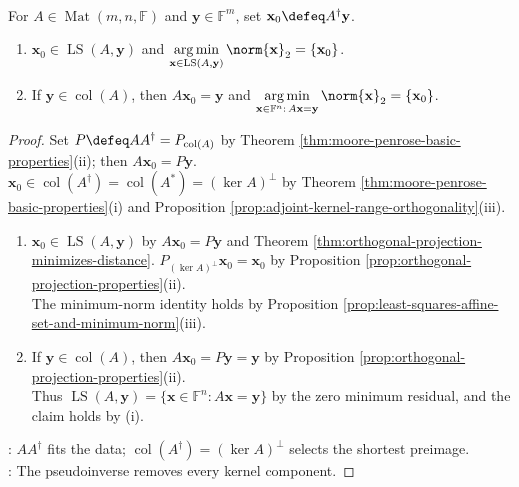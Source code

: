 \begin{theorem} \label{thm:pseudoinverse-minimum-norm-least-squares} \\
For $A\in\operatorname{Mat}(m,n,\mathbb{F})$ and $\mathbf{y}\in\mathbb{F}^m$, set $\mathbf{x}_0\defeq A^{\dagger}\mathbf{y}$.
\begin{enumerate}[label=(\roman*)]
\setlength{\itemsep}{0pt}
\item $\mathbf{x}_0\in\operatorname{LS}(A,\mathbf{y})$ and $\operatorname*{arg\,min}\limits_{\mathbf{x}\in\operatorname{LS}(A,\mathbf{y})}\norm{\mathbf{x}}_2=\{\mathbf{x}_0\}$.
\item If $\mathbf{y}\in\operatorname{col}(A)$, then $A\mathbf{x}_0=\mathbf{y}$ and $\operatorname*{arg\,min}\limits_{\mathbf{x}\in\mathbb{F}^n:\,A\mathbf{x}=\mathbf{y}}\norm{\mathbf{x}}_2=\{\mathbf{x}_0\}$.
\end{enumerate}
\begin{proof}
Set $P\defeq AA^{\dagger}=P_{\operatorname{col}(A)}$ by Theorem \ref{thm:moore-penrose-basic-properties}(ii); then $A\mathbf{x}_0=P\mathbf{y}$.\\
$\mathbf{x}_0\in\operatorname{col}(A^{\dagger})=\operatorname{col}(A^*)=(\ker A)^{\perp}$ by Theorem \ref{thm:moore-penrose-basic-properties}(i) and Proposition \ref{prop:adjoint-kernel-range-orthogonality}(iii).
\begin{enumerate}[label=(\roman*)]
\setlength{\itemsep}{0pt}
\item $\mathbf{x}_0\in\operatorname{LS}(A,\mathbf{y})$ by $A\mathbf{x}_0=P\mathbf{y}$ and Theorem \ref{thm:orthogonal-projection-minimizes-distance}. $P_{(\ker A)^{\perp}}\mathbf{x}_0=\mathbf{x}_0$ by Proposition \ref{prop:orthogonal-projection-properties}(ii).\\
The minimum-norm identity holds by Proposition \ref{prop:least-squares-affine-set-and-minimum-norm}(iii).
\item If $\mathbf{y}\in\operatorname{col}(A)$, then $A\mathbf{x}_0=P\mathbf{y}=\mathbf{y}$ by Proposition \ref{prop:orthogonal-projection-properties}(ii).\\
Thus $\operatorname{LS}(A,\mathbf{y})=\{\mathbf{x}\in\mathbb{F}^n:A\mathbf{x}=\mathbf{y}\}$ by the zero minimum residual, and the claim holds by (i).
\end{enumerate}
: $AA^{\dagger}$ fits the data; $\operatorname{col}(A^{\dagger})=(\ker A)^{\perp}$ selects the shortest preimage.\\
: The pseudoinverse removes every kernel component.
\end{proof}
\end{theorem}

